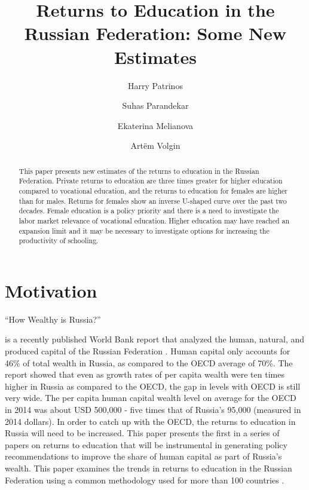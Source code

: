 \documentclass[alpha-refs]{wiley-article-01g}
\title{Returns to Education in the Russian Federation: Some New Estimates}
\author[*]{Harry Patrinos}
\author[*]{\hspace{-1em}Suhas Parandekar}
\author[*]{\hspace{-1em}Ekaterina Melianova}
\author[*]{\hspace{-1em}Art\"{e}m Volgin}
\affil[*]{Education Global Practice, Europe and Central Asia}
\begin{document}
\maketitle

\begin{abstract}
This paper presents new estimates of the returns to education in the Russian Federation. Private returns to education are three times greater for higher education compared to vocational education, and the returns to education for females are higher than for males. Returns for females show an inverse U-shaped curve over the past two decades. Female education is a policy priority and there is a need to investigate the labor market relevance of vocational education. Higher education may have reached an expansion limit and it may be necessary to investigate options for increasing the productivity of schooling.

\end{abstract}




\section{Motivation}

\begin{em}``How Wealthy is Russia?''\end{em} \hspace{-0.10em}is a recently published World Bank report that analyzed the human, natural, and produced capital of the Russian Federation \parencite{Naikal2019}. Human capital only accounts for 46\% of total wealth in Russia, as compared to the OECD average of 70\%.  The report showed that even as growth rates of per capita wealth were ten times higher in Russia as compared to the OECD, the gap in levels with OECD is still very wide. The per capita human capital wealth level on average for the OECD in 2014 was about USD 500,000 - five times that of Russia's 95,000 (measured in 2014 dollars). In order to catch up with the OECD, the returns to education in Russia will need to be increased. This paper presents the first in a series of papers on returns to education that will be instrumental in generating policy recommendations to improve the share of human capital as part of Russia's wealth. This paper examines the trends in returns to education in the Russian Federation using a common methodology used for more than 100 countries \parencite{Montenegro_Patrinos2014,Psacharopoulos_Patrinos2018}.  
\end{document}
